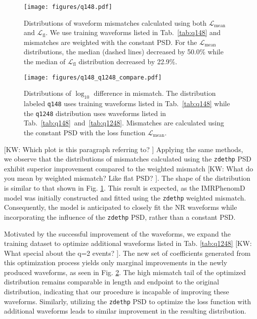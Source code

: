 \documentclass[twocolumn]{aastex631}
\newcommand{\zdethp}{\texttt{zdethp}}
\newcommand{\kw}[1]{{\color{rb4}[KW: #1 ]}}
\begin{document}
\begin{figure}[t]
	\centering
	\texttt{[image: figures/q148.pdf]}
	\caption{Distributions of waveform mismatches calculated using both
	$\mathcal{L}_{\mathrm{mean}}$ and $\mathcal{L}_{\mathrm{fl}}$. We use 
	training waveforms listed in Tab.~\ref{tab:q148} and
	mismatches are weighted with the constant PSD. For the
	$\mathcal{L}_{\mathrm{mean}}$ distributions, the median (dashed lines) decreased by 50.0\%
	while the median of $\mathcal{L}_{\mathrm{fl}}$ distribution decreased by
	22.9\%.}
	\label{fig:q148}
\end{figure}
\begin{figure}[t]
	\centering
	\texttt{[image: figures/q148\_q1248\_compare.pdf]}
	\caption{Distributions of $\log_{10}$ difference in mismatch. The
	distribution labeled \texttt{q148} uses training waveforms listed in
	Tab.~\ref{tab:q148} while the \texttt{q1248} distribution uses waveforms
	listed in Tab.~\ref{tab:q148}~and~\ref{tab:q1248}. Mismatches are calculated
	using the constant PSD with the loss function $\mathcal{L}_{\mathrm{mean}}$.}
	\label{fig:q148_q1248_compare}
\end{figure}

\kw{Which plot is this paragraph referring to?}
Applying the same methods, we observe that the distributions of mismatches
calculated using the {\zdethp} PSD exhibit superior improvement compared to the
weighted mismatch \kw{What do you mean by weighted mismatch? Like flat PSD?}.
The shape of the distribution is similar to that shown in Fig. \ref{fig:q148}.
This result is expected, as the IMRPhenomD model was initially constructed and
fitted using the {\zdethp} weighted mismatch. Consequently, the model is
anticipated to closely fit the NR waveforms while incorporating the influence of
the {\zdethp} PSD, rather than a constant PSD.

Motivated by the successful improvement of the waveforms, we expand the training
dataset to optimize additional waveforms listed in Tab. \ref{tab:q1248} \kw{What
special about the q=2 events?}. The new set of coefficients generated from this
optimization process yields only marginal improvements in the newly produced
waveforms, as seen in Fig. \ref{fig:q148_q1248_compare}. The high mismatch tail
of the optimized distribution remains comparable in length and endpoint to the
original distribution, indicating that our procedure is incapable of improving
these waveforms. Similarly, utilizing the {\zdethp} PSD to optimize the loss
function with additional waveforms leads to similar improvement in the resulting
distribution.
\end{document}
